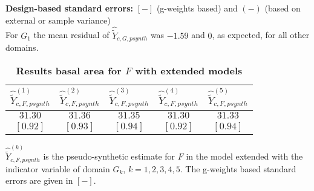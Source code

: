 \documentclass[a4paper,12pt,leqno, titlepage]{article}
\begin{document}
\begin{table}[h]
\begin{center}
\begin{tabular}{l|c|c|c|c|c|}
\end{tabular}
\end{center}
\textbf{Design-based standard errors:} $[-]$ (g-weights based) and $(-)$ (based on external or sample variance)\\
For $G_1$ the mean residual of $ \hat{\tilde{Y}}_{c,G,psynth}$ was $-1.59$ and $0$, as expected, for all other domains.
\end{table}

\begin{table}[h]
\begin{center}
\caption{ \label{result2}\textbf{Results basal area for $F$ with extended models}}
\end{center}
\begin{center}
 \begin{tabular}{|c|c|c|c|c|}\hline
  $\hat{\tilde{Y}}^{(1)}_{c,F,psynth}$  & $\hat{\tilde{Y}}^{(2)}_{c,F,psynth}$& $\hat{\tilde{Y}}^{(3)}_{c,F,psynth}$  & $\hat{\tilde{Y}}^{(4)}_{c,F,psynth}$ &  $\hat{\tilde{Y}}^{(5)}_{c,F,psynth}$ \\[1.0ex] \hline \hline
  $31.30$    & $31.36$   & $31.35$   & $31.30$  & $31.33$ \\[1.0ex]
  $[0.92] $  & $[0.93]$  & $[0.94]$  & $[0.92]$ & $[0.94]$ \\[1.0ex] \hline \hline
\end{tabular}
\end{center}
$\hat{\tilde{Y}}^{(k)}_{c,F,psynth}$ is the pseudo-synthetic estimate for $F$ in the model extended with the indicator variable of domain $G_k$, $k=1,2,3,4,5$. The g-weights based standard errors are given in $[-]$.
\end{table}

\newpage
\end{document}
